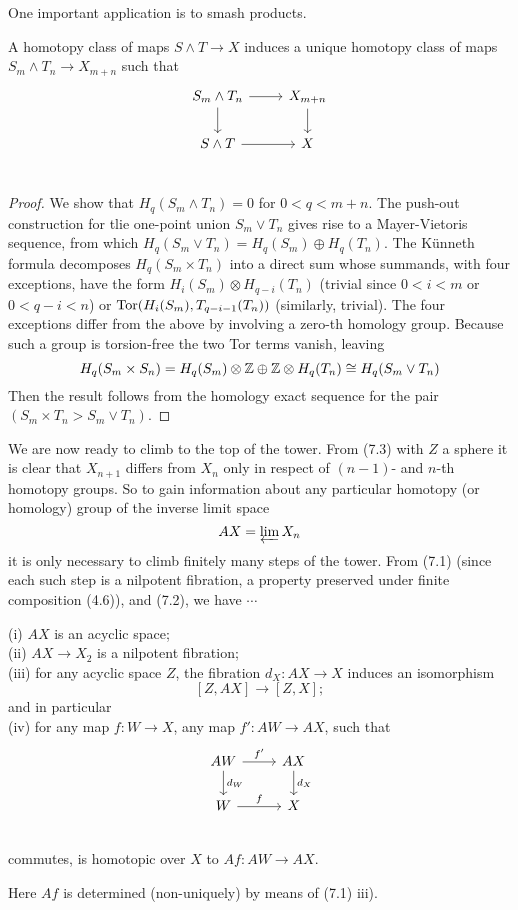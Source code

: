 One important application is to smash products.
\begin{corollary}
  A homotopy class of maps $S\wedge T \longrightarrow X$ induces a unique homotopy class of maps $S_m \wedge T_n\rightarrow X_{m+n}$ such that
  \[
\begin{tikzcd}
S_m \wedge T_n \arrow[r] \arrow[d] & X_{m+n} \arrow[d]\\
S\wedge T \arrow{r} & X\\
\end{tikzcd}
  \]
\end{corollary}
\begin{proof}
 We show that $H_q(S_m \wedge T_n) = 0$ for $0 < q < m+n$. The push-out construction for tlie one-point union $S_m \vee T_n$ gives rise to a Mayer-Vietoris sequence, from which $H_q(S_m\vee T_n) = H_q(S_m) \oplus H_q(T_n)$. The K\"{u}nneth formula decomposes $H_q(S_m\times T_n)$ into a direct sum whose summands, with four exceptions, have the form $H_i(S_m) \otimes H_{q-i}(T_n)$ (trivial since $0 < i < m$ or $0 < q-i < n$) or $\mathrm{Tor} (H_i(S_m ), T_{q-i-1}(T_n))$ (similarly, trivial). The four exceptions differ from the above by involving a zero-th homology group. Because such a group is torsion-free the two Tor terms vanish, leaving
 \[H_q(S_m\times S_n) = H_q(S_m)\otimes \mathbb{Z} \oplus \mathbb{Z} \otimes H_q(T_n)\cong H_q(S_m\vee T_n)\]
Then the result follows from the homology exact sequence for the pair $(S_m\times T_n> S_m\vee T_n)$.
 \end{proof}
  
We are now ready to climb to the top of the tower. From (7.3) with $Z$ a sphere it is clear that $X_{n+1}$ differs from $X_n$ only in respect of $(n-1)$- and $n$-th homotopy groups. So to gain information about any particular homotopy (or homology) group of the inverse limit space
\[AX = \varprojlim X_n\]
it is only necessary to climb finitely many steps of the tower. From (7.1) (since each such step is a nilpotent fibration, a property preserved under finite composition (4.6)), and (7.2), we have $\cdots$
\begin{prop}
  (i) $AX$ is an acyclic space; \\
(ii) $AX \longrightarrow X_2$ is a nilpotent fibration;\\
(iii) for any acyclic space $Z$, the fibration $d_X \colon  AX\longrightarrow X$ induces an isomorphism 
\[[Z,AX] \longrightarrow [Z,X];\]
and in particular\\
(iv) for any map $f \colon   W \longrightarrow X$, any map $f' \colon   AW\longrightarrow AX$, such that
  \[
\begin{tikzcd}
AW \arrow[r,"f'"] \arrow[d,"d_W"] & AX \arrow[d,"d_X"]\\
W \arrow{r}{f} & X\\
\end{tikzcd}
  \]
commutes, is homotopic over $X$ to $Af\colon   AW \longrightarrow AX$.
\end{prop}
Here $Af$ is determined (non-uniquely) by means of (7.1) iii).

